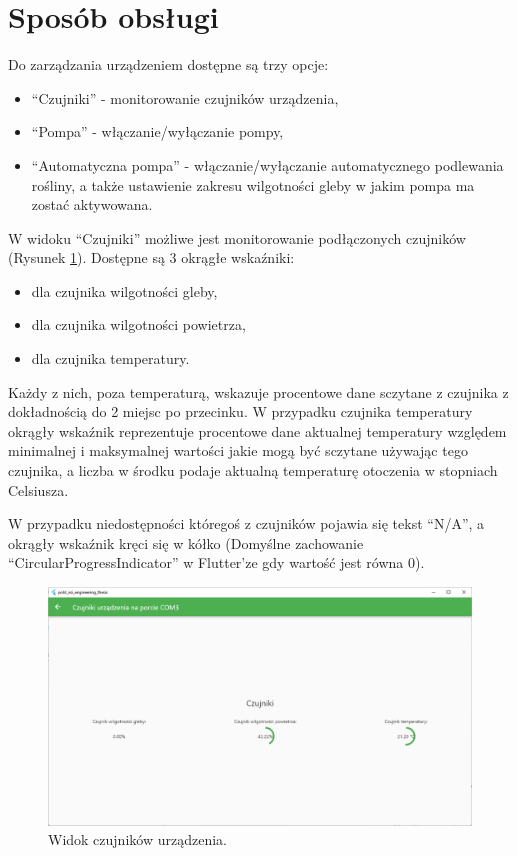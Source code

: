 \documentclass[a4paper,twoside,12pt]{book}
\begin{document}
\section{Sposób obsługi}

Do zarządzania urządzeniem dostępne są trzy opcje:

\begin{itemize}
   \item ``Czujniki'' - monitorowanie czujników urządzenia,
   \item ``Pompa'' - włączanie/wyłączanie pompy,
   \item ``Automatyczna pompa'' - włączanie/wyłączanie automatycznego podlewania rośliny, a także ustawienie zakresu wilgotności gleby w jakim pompa ma zostać aktywowana.
\end{itemize}

\newpage

W widoku ``Czujniki'' możliwe jest monitorowanie podłączonych czujników (Rysunek \ref{fig:16}). Dostępne są 3 okrągłe wskaźniki:

\begin{itemize}
   \item dla czujnika wilgotności gleby,
   \item dla czujnika wilgotności powietrza,
   \item dla czujnika temperatury.
\end{itemize}

Każdy z nich, poza temperaturą, wskazuje procentowe dane sczytane z czujnika z dokładnością do 2 miejsc po przecinku. W przypadku czujnika temperatury okrągły wskaźnik reprezentuje procentowe dane aktualnej temperatury względem minimalnej i maksymalnej wartości jakie mogą być sczytane używając tego czujnika, a liczba w środku podaje aktualną temperaturę otoczenia w stopniach Celsiusza.

W przypadku niedostępności któregoś z czujników pojawia się tekst ``N/A'', a okrągły wskaźnik kręci się w kółko (Domyślne zachowanie ``CircularProgressIndicator'' w Flutter'ze gdy wartość jest równa 0).

\begin{figure}[H]
   \centering
   \includegraphics[width=\textwidth]{./assets/img/img016.png}
   \caption{Widok czujników urządzenia.}
   \label{fig:16}
\end{figure}
\end{document}
